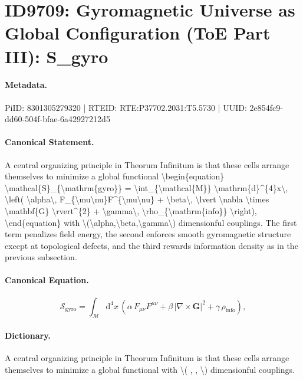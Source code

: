 \section*{ID9709: Gyromagnetic Universe as Global Configuration (ToE Part III): S\_gyro}
\paragraph{Metadata.}
PiID: 8301305279320 | RTEID: RTE:P37702.2031:T5.5730 | UUID: 2e854fc9-dd60-504f-bfae-6a42927212d5

\paragraph{Canonical Statement.}
A central organizing principle in Theorum Infinitum is that these cells arrange themselves to minimize a global functional \textbackslash{}begin\{equation\} \textbackslash{}mathcal\{S\}\_\{\textbackslash{}mathrm\{gyro\}\} = \textbackslash{}int\_\{\textbackslash{}mathcal\{M\}\} \textbackslash{}mathrm\{d\}\textasciicircum{}\{4\}x\textbackslash{}, \textbackslash{}left( \textbackslash{}alpha\textbackslash{}, F\_\{\textbackslash{}mu\textbackslash{}nu\}F\textasciicircum{}\{\textbackslash{}mu\textbackslash{}nu\} + \textbackslash{}beta\textbackslash{}, \textbackslash{}lvert \textbackslash{}nabla \textbackslash{}times \textbackslash{}mathbf\{G\} \textbackslash{}rvert\textasciicircum{}\{2\} + \textbackslash{}gamma\textbackslash{}, \textbackslash{}rho\_\{\textbackslash{}mathrm\{info\}\} \textbackslash{}right), \textbackslash{}end\{equation\} with \textbackslash{}(\textbackslash{}alpha,\textbackslash{}beta,\textbackslash{}gamma\textbackslash{}) dimensionful couplings. The first term penalizes field energy, the second enforces smooth gyromagnetic structure except at topological defects, and the third rewards information density as in the previous subsection.

\paragraph{Canonical Equation.}
\[
\mathcal{S}_{\mathrm{gyro}} = \int_{\mathcal{M}} \mathrm{d}^{4}x\, \left( \alpha\, F_{\mu\nu}F^{\mu\nu} + \beta\, \lvert \nabla \times \mathbf{G} \rvert^{2} + \gamma\, \rho_{\mathrm{info}} \right),
\]

\paragraph{Dictionary.}
A central organizing principle in Theorum Infinitum is that these cells arrange themselves to minimize a global functional with \textbackslash{}( , , \textbackslash{}) dimensionful couplings.

